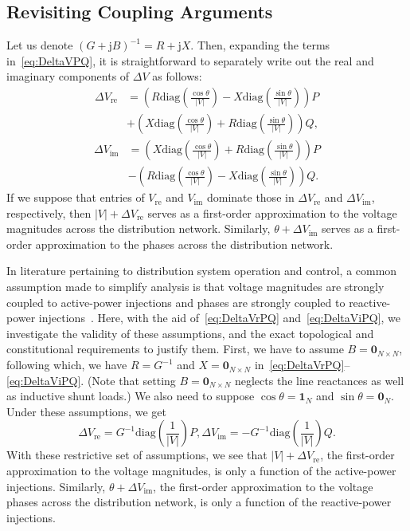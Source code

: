 \documentclass[10 pt, conference]{ieeeconf}
\begin{document}
\subsection{Revisiting Coupling Arguments}
Let us denote $(G + \mathrm j B)^{-1} = R + \mathrm j X$. Then, expanding the terms in~\eqref{eq:DeltaVPQ}, it is straightforward to separately write out the real and imaginary components of $\Delta V$ as follows: 
\begin{align} \label{eq:DeltaVrPQ}
\Delta V_\mathrm{re} &= \left(R \mathrm{diag}\left(\frac{\cos \theta}{|V|}\right) - X \mathrm{diag}\left(\frac{\sin \theta}{|V|}\right) \right) P \nonumber \\
&+ \left(X \mathrm{diag}\left(\frac{\cos \theta}{|V|}\right) + R \mathrm{diag}\left(\frac{\sin \theta}{|V|}\right) \right) Q,
\end{align}
\begin{align} \label{eq:DeltaViPQ}
\Delta V_\mathrm{im} &= \left(X \mathrm{diag}\left(\frac{\cos \theta}{|V|}\right) + R \mathrm{diag}\left(\frac{\sin \theta}{|V|}\right) \right) P \nonumber \\
&- \left(R \mathrm{diag}\left(\frac{\cos \theta}{|V|}\right) - X \mathrm{diag}\left(\frac{\sin \theta}{|V|}\right) \right) Q.
\end{align}
If we suppose that entries of $V_\mathrm{re}$ and $V_\mathrm{im}$ dominate those in $\Delta V_\mathrm{re}$ and $\Delta V_\mathrm{im}$, respectively, then $|V| + \Delta V_\mathrm{re}$ serves as a first-order approximation to the voltage magnitudes  across the distribution network. Similarly, $\theta + \Delta V_\mathrm{im}$ serves as a first-order approximation to the phases  across the distribution network.

In literature pertaining to distribution system operation and control, a common assumption made to simplify analysis is that voltage magnitudes are strongly coupled to active-power injections and phases are strongly coupled to reactive-power injections~\cite{Robbins-2013,Zhong-2013,Emiliano-2015}. Here, with the aid of~\eqref{eq:DeltaVrPQ} and~\eqref{eq:DeltaViPQ}, we investigate the validity of these assumptions, and the exact topological and constitutional requirements to justify them. First, we have to assume $B = \mathbf{0}_{N \times N}$, following which, we have $R = G^{-1}$ and $X = \mathbf{0}_{N \times N}$ in~\eqref{eq:DeltaVrPQ}--\eqref{eq:DeltaViPQ}. (Note that setting $B = \mathbf{0}_{N\times N}$ neglects the line reactances as well as inductive shunt loads.) We also need to suppose $\cos \theta = \mathbf{1}_N$ and $\sin \theta = \mathbf{0}_N$. Under these assumptions, we get    
\begin{equation*} \label{eq:DeltaVriPQspecial}
\Delta V_\mathrm{re} = G^{-1} \mathrm{diag}\left(\frac{1}{|V|}\right) P, \Delta V_\mathrm{im} = - G^{-1} \mathrm{diag}\left(\frac{1}{|V|}\right)Q.
\end{equation*}
With these restrictive set of assumptions, we see that $|V| + \Delta V_\mathrm{re}$, the first-order approximation to the voltage magnitudes, is only a function of the active-power injections. Similarly, $\theta + \Delta V_\mathrm{im}$, the first-order approximation to the voltage phases across the distribution network, is only a function of the reactive-power injections.
\end{document}
